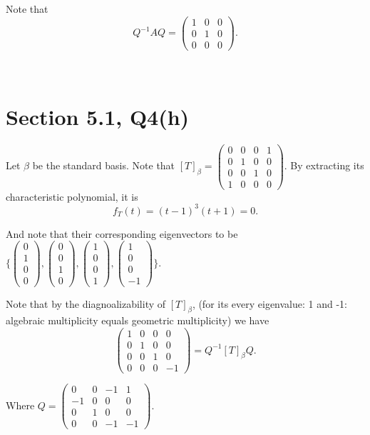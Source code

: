 \documentclass[12pt]{article}%
\begin{document}
Note that $$Q^{-1}AQ =\begin{pmatrix}1&0&0\\0&1&0\\0&0&0\end{pmatrix}.$$ 

~\ 

\section{Section 5.1, Q4(h)}
Let $\beta$ be the standard basis.
Note that $[T]_{\beta}= \begin{pmatrix}0&0&0&1\\0&1&0&0\\0&0&1&0\\1&0&0&0\end{pmatrix}.$ By extracting its characteristic polynomial, it is $$f_{T}(t)=(t-1)^3(t+1)=0.$$

And note that their corresponding eigenvectors to be $\{\begin{pmatrix}0\\1\\0\\0\end{pmatrix},\begin{pmatrix}0\\0\\1\\0\end{pmatrix},\begin{pmatrix}1\\0\\0\\1\end{pmatrix},\begin{pmatrix}1\\0\\0\\-1\end{pmatrix}\}.$

Note that by the diagnoalizability of $[T]_\beta$, (for its every eigenvalue: 1 and -1: algebraic multiplicity equals geometric multiplicity) we have $$\begin{pmatrix}1&0&0&0\\0&1&0&0\\0&0&1&0\\0&0&0&-1\end{pmatrix}=Q^{-1}[T]_\beta Q.$$

Where $Q=\begin{pmatrix}0&0&-1&1\\-1&0&0&0\\0&1&0&0\\0&0&-1&-1\end{pmatrix}.$
\end{document}
